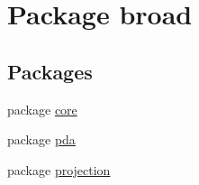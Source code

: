 \hypertarget{namespacebroad}{\section{Package broad}
\label{namespacebroad}
}
\subsection*{Packages}
\begin{DoxyCompactItemize}
\item 
package \hyperlink{namespacebroad_1_1core}{core}
\item 
package \hyperlink{namespacebroad_1_1pda}{pda}
\item 
package \hyperlink{namespacebroad_1_1projection}{projection}
\end{DoxyCompactItemize}
